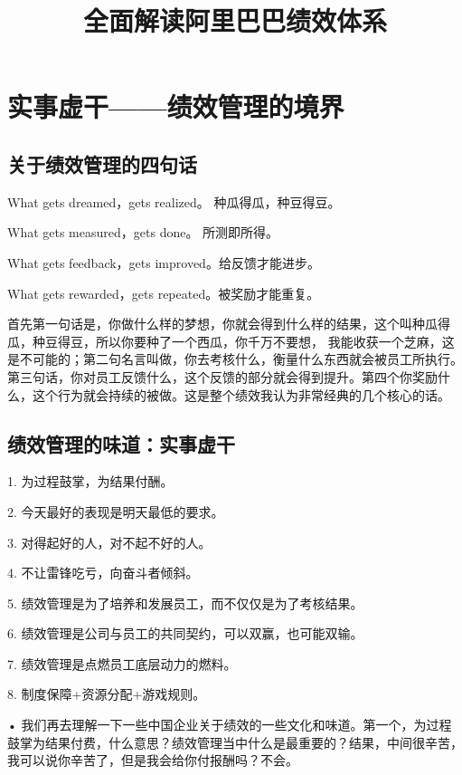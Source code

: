 \documentclass[12pt]{article}
\title{全面解读阿里巴巴绩效体系}
\begin{document}
\maketitle
\tableofcontents

\section{实事虚干——绩效管理的境界}
\subsection{关于绩效管理的四句话}
\begin{framed}
What gets dreamed，gets realized。 种瓜得瓜，种豆得豆。 

What gets measured，gets done。 所测即所得。 

What gets feedback，gets improved。给反馈才能进步。 

What gets rewarded，gets repeated。被奖励才能重复。

首先第一句话是，你做什么样的梦想，你就会得到什么样的结果，这个叫种瓜得瓜，种豆得豆，所以你要种了一个西瓜，你千万不要想， 我能收获一个芝麻，这是不可能的；第二句名言叫做，你去考核什么，衡量什么东西就会被员工所执行。第三句话，你对员工反馈什么，这个反馈的部分就会得到提升。第四个你奖励什么，这个行为就会持续的被做。这是整个绩效我认为非常经典的几个核心的话。
\end{framed}

\subsection{绩效管理的味道：实事虚干}
\begin{framed}
1. 为过程鼓掌，为结果付酬。

2. 今天最好的表现是明天最低的要求。

3. 对得起好的人，对不起不好的人。

4. 不让雷锋吃亏，向奋斗者倾斜。

5. 绩效管理是为了培养和发展员工，而不仅仅是为了考核结果。

6. 绩效管理是公司与员工的共同契约，可以双赢，也可能双输。

7. 绩效管理是点燃员工底层动力的燃料。

8. 制度保障+资源分配+游戏规则。
\end{framed}

• 我们再去理解一下一些中国企业关于绩效的一些文化和味道。第一个，为过程鼓掌为结果付费，什么意思？绩效管理当中什么是最重要的？结果，中间很辛苦，我可以说你辛苦了，但是我会给你付报酬吗？不会。
\end{document}
